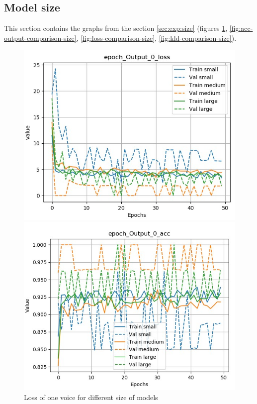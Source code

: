 \documentclass[12pt]{report}
\begin{document}
\subsection{Model size}
\label{appendix:size}

This section contains the graphs from the section \ref{sec:exp:size} (figures \ref{fig:loss-output-comparison-size}, \ref{fig:acc-output-comparison-size}, \ref{fig:loss-comparison-size}, \ref{fig:kld-comparison-size}).

\begin{figure}[htbp]
    \begin{minipage}{0.5\textwidth}
        \begin{center}
            \includegraphics[width=\textwidth]{images/experiences/size/loss-output-comparison-size.jpg}
            \caption{Loss of one voice for different size of models}
            \label{fig:loss-output-comparison-size}
        \end{center}
    \end{minipage} \hfill
    \begin{minipage}{0.5 \textwidth}
        \begin{center}
            \includegraphics[width=\textwidth]{images/experiences/size/acc-output-comparison-size.jpg}

\end{center}
\end{minipage}
\end{figure}
\end{document}
